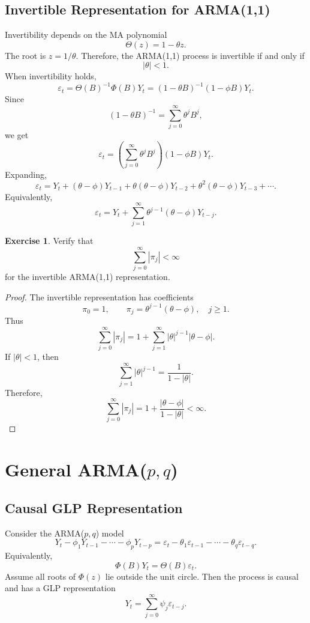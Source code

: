 \documentclass[12pt,oneside]{book}
\numberwithin{equation}{section}
\theoremstyle{definition}
\newtheorem{exercise}{Exercise}[section]
\theoremstyle{plain}
\theoremstyle{remark}
\begin{document}
\subsection{Invertible Representation for ARMA(1,1)}

Invertibility depends on the MA polynomial
\[
\Theta(z)=1-\theta z.
\]
The root is $z=1/\theta$. Therefore, the ARMA(1,1) process is invertible if and only if
\[
|\theta|<1.
\]
When invertibility holds,
\[
\varepsilon_t
=
\Theta(B)^{-1}\Phi(B)Y_t
=
(1-\theta B)^{-1}(1-\phi B)Y_t.
\]
Since
\[
(1-\theta B)^{-1}
=
\sum_{j=0}^{\infty}\theta^jB^j,
\]
we get
\[
\varepsilon_t
=
\left(\sum_{j=0}^{\infty}\theta^jB^j\right)(1-\phi B)Y_t.
\]
Expanding,
\[
\varepsilon_t
=
Y_t+(\theta-\phi)Y_{t-1}
+\theta(\theta-\phi)Y_{t-2}
+\theta^2(\theta-\phi)Y_{t-3}
+\cdots.
\]
Equivalently,
\[
\varepsilon_t
=
Y_t+\sum_{j=1}^{\infty}\theta^{j-1}(\theta-\phi)Y_{t-j}.
\]

\begin{exercise}
Verify that
\[
\sum_{j=0}^{\infty}|\pi_j|<\infty
\]
for the invertible ARMA(1,1) representation.
\end{exercise}

\begin{proof}
The invertible representation has coefficients
\[
\pi_0=1,
\qquad
\pi_j=\theta^{j-1}(\theta-\phi),
\quad j\geq 1.
\]
Thus
\[
\sum_{j=0}^{\infty}|\pi_j|
=
1+\sum_{j=1}^{\infty}|\theta|^{j-1}|\theta-\phi|.
\]
If $|\theta|<1$, then
\[
\sum_{j=1}^{\infty}|\theta|^{j-1}
=
\frac{1}{1-|\theta|}.
\]
Therefore,
\[
\sum_{j=0}^{\infty}|\pi_j|
=
1+\frac{|\theta-\phi|}{1-|\theta|}
<\infty.
\]
\end{proof}

\section{General ARMA($p,q$)}

\subsection{Causal GLP Representation}

Consider the ARMA($p,q$) model
\[
Y_t-\phi_1Y_{t-1}-\cdots-\phi_pY_{t-p}
=
\varepsilon_t-\theta_1\varepsilon_{t-1}-\cdots-\theta_q\varepsilon_{t-q}.
\]
Equivalently,
\[
\Phi(B)Y_t=\Theta(B)\varepsilon_t.
\]
Assume all roots of $\Phi(z)$ lie outside the unit circle. Then the process is causal and has a GLP representation
\[
Y_t=\sum_{j=0}^{\infty}\psi_j\varepsilon_{t-j}.
\]
\end{document}
